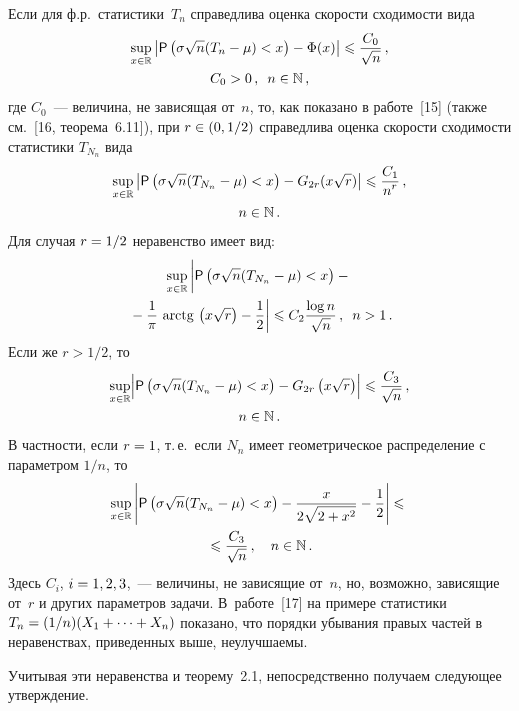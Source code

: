 \begin{multicols}{2}
Если для ф.р.\ статистики~$T_n$ справедлива оценка ско\-рости
сходимости вида
\begin{multline}
\sup\limits_{x\in\mathbb{R}}\left\vert{\sf P}\left(\sigma\sqrt n(T_n - \mu) < x\right)
-\Phi(x)  \right\vert\leqslant \displaystyle\frac{\displaystyle C_0\mathstrut}{\displaystyle \sqrt n\mathstrut}\,,\\ 
C_0>0\,, \enskip n\in\mathbb N\,,
\label{e2.2-ben}
\end{multline}
где $C_0$~--- величина, не зависящая от~$n$, то, как показано в
работе~[15] (также см.~[16, теорема~6.11]), при $r\hm\in(0,1/2)$
справедлива оценка скорости сходимости статистики $T_{N_n}$ вида
\begin{multline*}
\sup\limits_{x\in\mathbb{R}}\left\vert{\sf P}\left(\sigma\sqrt n(T_{N_n} - \mu) <
x\right)-G_{2r}(x\sqrt r)\right\vert\leqslant  \displaystyle\frac{\displaystyle C_1\mathstrut}{\displaystyle n^{r}\mathstrut}\,, \\
n\in\mathbb N\,.
\end{multline*}
Для случая $r\hm=1/2$ неравенство имеет вид:
\begin{multline*}
\sup\limits_{x\in\r}\left\vert\vphantom{\fr{1}{2}}
{\sf P}\left(\sigma\sqrt n(T_{N_n} - \mu) <
x\right)-{}\right.\\
\left.{}-\fr{1}{\pi}\,\arctg\left(x\sqrt{r}\right)-\fr{1}{2}  \right\vert\leqslant
C_2 \fr{\log n}{\sqrt{n}}\,,\enskip n>1\,.
\end{multline*}
Если же $r>1/2$, то
\begin{multline*}
\sup\limits_{x\in\mathbb{R}}\Bigl|{\sf P}\left(\sigma\sqrt n(T_{N_n} - \mu) <
x\right)-G_{2r}\left(x\sqrt{r}\right)  \Bigr|\leqslant \displaystyle\frac{\displaystyle C_3\mathstrut}{\displaystyle \sqrt{n}\mathstrut}\,,\\
 n\in\mathbb N\,.
\end{multline*}
В частности, если $r\hm=1$, т.\,е.\ если $N_n$ имеет гео\-мет\-ри\-че\-ское
распределение с параметром $1/n$, то
\begin{multline*}
\sup\limits_{x\in\mathbb{R}}\left\vert{\sf P}\left(\sigma\sqrt n(T_{N_n} - \mu) <
x\right)-\displaystyle\frac{\displaystyle x\mathstrut}{\displaystyle 2\sqrt{2+x^2}\mathstrut}-\displaystyle\frac{\displaystyle 1\mathstrut}{\displaystyle 2\mathstrut} \right\vert\leqslant{}\\
{}\leqslant
\displaystyle\frac{\displaystyle C_3\mathstrut}{\displaystyle \sqrt{n}\mathstrut}\,,\quad n\in\mathbb N\,.
\end{multline*}
Здесь $C_i$, $i\hm=1,2,3$,~--- величины, не зависящие от~$n$, но,
возможно, зависящие от~$r$ и других параметров задачи. В~работе~[17]
на примере статистики $T_n\hm=(1/n)(X_1+\cdots+X_n)$ показано, что
порядки убывания правых частей в неравенствах, приведенных выше,
неулучшаемы.

Учитывая эти неравенства и теорему~2.1, непосредственно получаем
следующее утверждение.


\end{multicols}
